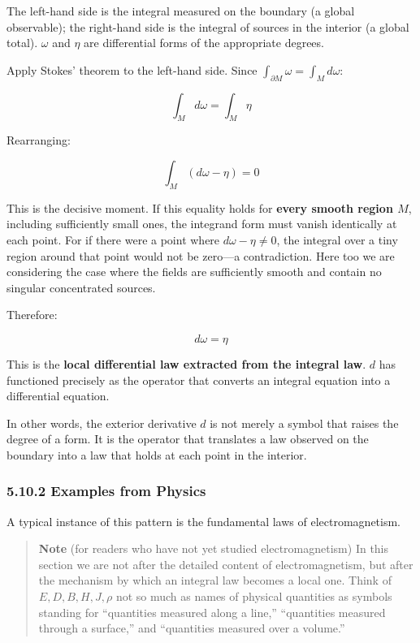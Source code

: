 The left-hand side is the integral measured on the boundary (a global
observable); the right-hand side is the integral of sources in the
interior (a global total). \(\omega\) and \(\eta\) are differential
forms of the appropriate degrees.

Apply Stokes' theorem to the left-hand side. Since
\(\int_{\partial M} \omega = \int_M d\omega\):

\[\int_M d\omega = \int_M \eta\]

Rearranging:

\[\int_M (d\omega - \eta) = 0\]

This is the decisive moment. If this equality holds for
\textbf{every smooth region $M$}, including sufficiently small ones, the
integrand form must vanish identically at each point. For if there were
a point where \(d\omega - \eta \neq 0\), the integral over a tiny region
around that point would not be zero---a contradiction. Here too we are
considering the case where the fields are sufficiently smooth and
contain no singular concentrated sources.

Therefore:

\[d\omega = \eta\]

This is the
\textbf{local differential law extracted from the integral law}. \(d\)
has functioned precisely as the operator that converts an integral
equation into a differential equation.

In other words, the exterior derivative \(d\) is not merely a symbol
that raises the degree of a form. It is the operator that translates a
law observed on the boundary into a law that holds at each point in the
interior.

\hypertarget{examples-from-physics}{%
\subsubsection{5.10.2 Examples from
Physics}\label{examples-from-physics}}

A typical instance of this pattern is the fundamental laws of
electromagnetism.

\begin{quote}
\textbf{Note} (for readers who have not yet studied electromagnetism) In
this section we are not after the detailed content of electromagnetism,
but after the mechanism by which an integral law becomes a local one.
Think of \(E,D,B,H,J,\rho\) not so much as names of physical quantities
as symbols standing for ``quantities measured along a line,''
``quantities measured through a surface,'' and ``quantities measured
over a volume.''
\end{quote}

